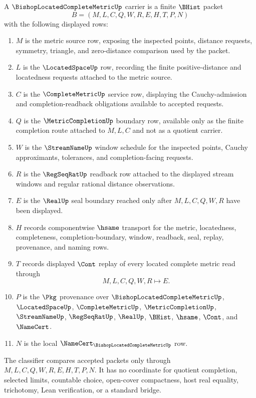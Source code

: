 \begin{definition}
\label{def:bishop-located-complete-metric-carrier}
A $\BishopLocatedCompleteMetricUp$ carrier is a finite $\BHist$ packet
$$
B=(M,L,C,Q,W,R,E,H,T,P,N)
$$
with the following displayed rows:
\begin{enumerate}
\item $M$ is the metric source row, exposing the inspected points, distance requests, symmetry, triangle, and zero-distance comparison used by the packet.
\item $L$ is the $\LocatedSpaceUp$ row, recording the finite positive-distance and locatedness requests attached to the metric source.
\item $C$ is the $\CompleteMetricUp$ service row, displaying the Cauchy-admission and completion-readback obligations available to accepted requests.
\item $Q$ is the $\MetricCompletionUp$ boundary row, available only as the finite completion route attached to $M,L,C$ and not as a quotient carrier.
\item $W$ is the $\StreamNameUp$ window schedule for the inspected points, Cauchy approximants, tolerances, and completion-facing requests.
\item $R$ is the $\RegSeqRatUp$ readback row attached to the displayed stream windows and regular rational distance observations.
\item $E$ is the $\RealUp$ seal boundary reached only after $M,L,C,Q,W,R$ have been displayed.
\item $H$ records componentwise $\hsame$ transport for the metric, locatedness, completeness, completion-boundary, window, readback, seal, replay, provenance, and naming rows.
\item $T$ records displayed $\Cont$ replay of every located complete metric read through
$$
M,L,C,Q,W,R \longmapsto E .
$$
\item $P$ is the $\Pkg$ provenance over $\BishopLocatedCompleteMetricUp$, $\LocatedSpaceUp$, $\CompleteMetricUp$, $\MetricCompletionUp$, $\StreamNameUp$, $\RegSeqRatUp$, $\RealUp$, $\BHist$, $\hsame$, $\Cont$, and $\NameCert$.
\item $N$ is the local $\NameCert_{\BishopLocatedCompleteMetricUp}$ row.
\end{enumerate}
The classifier compares accepted packets only through $M,L,C,Q,W,R,E,H,T,P,N$. It has no coordinate for quotient completion, selected limits, countable choice, open-cover compactness, host real equality, trichotomy, Lean verification, or a standard bridge.
\end{definition}

